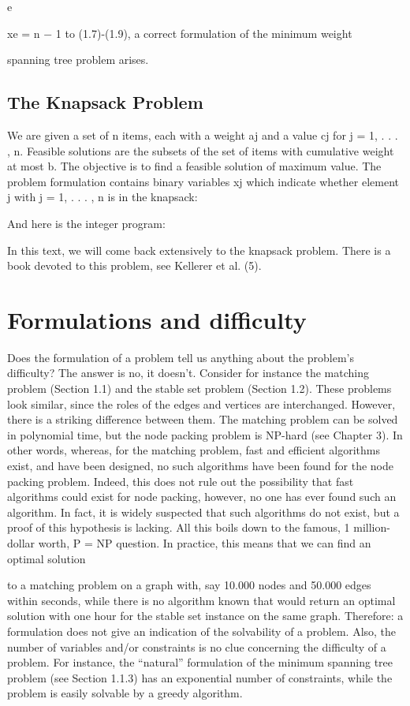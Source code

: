 \documentclass[titlepage]{book}
\begin{document}
e

xe = n − 1 to (1.7)-(1.9), a correct formulation of the minimum weight

spanning tree problem arises.

\subsection{The Knapsack Problem}

We are given a set of n items, each with a weight aj and a value cj for j = 1, . . . , n. Feasible solutions
are the subsets of the set of items with cumulative weight at most b. The objective is to find a feasible
solution of maximum value. The problem formulation contains binary variables xj which indicate whether
element j with j = 1, . . . , n is in the knapsack:


And here is the integer program:


In this text, we will come back extensively to the knapsack problem. There is a book devoted to this
problem, see Kellerer et al. (5).

\section{Formulations and difficulty}

Does the formulation of a problem tell us anything about the problem's difficulty? The answer is no,
it doesn't. Consider for instance the matching problem (Section 1.1) and the stable set problem (Section 1.2). These problems look similar, since the roles of the edges and vertices are interchanged. However,
there is a striking difference between them. The matching problem can be solved in polynomial time, but
the node packing problem is NP-hard (see Chapter 3). In other words, whereas, for the matching problem, fast and efficient algorithms exist, and have been designed, no such algorithms have been found for
the node packing problem. Indeed, this does not rule out the possibility that fast algorithms could exist
for node packing, however, no one has ever found such an algorithm. In fact, it is widely suspected that
such algorithms do not exist, but a proof of this hypothesis is lacking. All this boils down to the famous,
1 million-dollar worth, P = NP question. In practice, this means that we can find an optimal solution

to a matching problem on a graph with, say 10.000 nodes and 50.000 edges within seconds, while there
is no algorithm known that would return an optimal solution with one hour for the stable set instance
on the same graph. Therefore: a formulation does not give an indication of the solvability of a problem.
Also, the number of variables and/or constraints is no clue concerning the difficulty of a problem. For
instance, the “natural” formulation of the minimum spanning tree problem (see Section 1.1.3) has an
exponential number of constraints, while the problem is easily solvable by a greedy algorithm.
\end{document}
